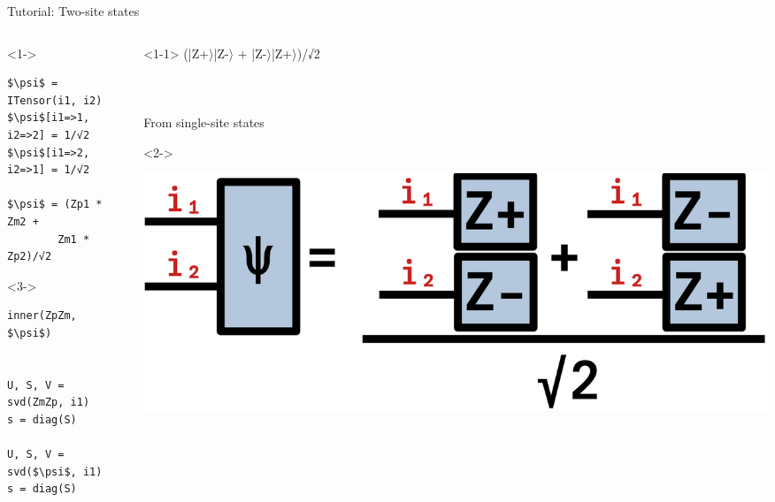 \begin{frame}[fragile]{Tutorial: Two-site states}

\begin{columns}

\begin{column}{5cm}

\begin{onlyenv}<1->
\begin{lstlisting}[language=JuliaLocal, style=julia, mathescape, basicstyle=\small]
$\psi$ = ITensor(i1, i2)
$\psi$[i1=>1, i2=>2] = 1/√2
$\psi$[i1=>2, i2=>1] = 1/√2

$\psi$ = (Zp1 * Zm2 +
        Zm1 * Zp2)/√2
\end{lstlisting}
\end{onlyenv}

\begin{onlyenv}<3->
\begin{lstlisting}[language=JuliaLocal, style=julia, mathescape, basicstyle=\small]
inner(ZpZm, $\psi$)


U, S, V = svd(ZmZp, i1)
s = diag(S)

U, S, V = svd($\psi$, i1)
s = diag(S)
\end{lstlisting}
\end{onlyenv}

\end{column}

\begin{column}{5cm}

\begin{onlyenv}<1-1>
(|Z+$\rangle$|Z-$\rangle$ + |Z-$\rangle$|Z+$\rangle$)/√2 \\
~\\
~\\
~\\
From single-site states \\
\end{onlyenv}

\begin{onlyenv}<2->
\vspace*{0.0cm}
\begin{center}
\includegraphics[width=1.0\textwidth]{
  slides/assets/cat12.png
}
\end{center}
\vspace*{0.0cm}
\end{onlyenv}


\end{column}
\end{columns}
\end{frame}
